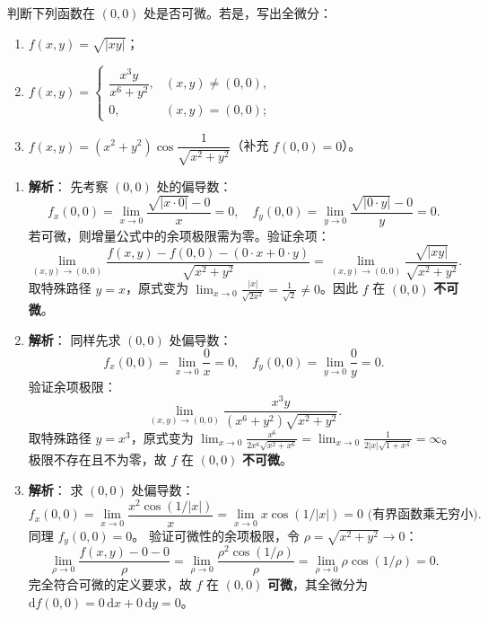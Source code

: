 \documentclass[lang=cn,11pt]{elegantbook}
\begin{document}
\begin{exercise}[可微性判定]
判断下列函数在 $(0,0)$ 处是否可微。若是，写出全微分：
\begin{enumerate}
  \item[(1)] $f(x,y)=\sqrt{|xy|}$；
  \item[(2)] $f(x,y)=\begin{cases} \dfrac{x^3y}{x^6+y^2},&(x,y) \neq (0,0),\\[8pt] 0,&(x,y)=(0,0); \end{cases}$
  \item[(3)] $f(x,y)=(x^2+y^2)\cos\dfrac{1}{\sqrt{x^2+y^2}}$（补充 $f(0,0)=0$）。
\end{enumerate}
\end{exercise}
\begin{solution}
\begin{enumerate}
  \item[(1)] \textbf{解析}：
  先考察 $(0,0)$ 处的偏导数：
  \[
  f_x(0,0) = \lim_{x \to 0} \frac{\sqrt{|x \cdot 0|} - 0}{x} = 0, \quad f_y(0,0) = \lim_{y \to 0} \frac{\sqrt{|0 \cdot y|} - 0}{y} = 0.
  \]
  若可微，则增量公式中的余项极限需为零。验证余项：
  \[
  \lim_{(x,y) \to (0,0)} \frac{f(x,y) - f(0,0) - (0 \cdot x + 0 \cdot y)}{\sqrt{x^2+y^2}} = \lim_{(x,y) \to (0,0)} \frac{\sqrt{|xy|}}{\sqrt{x^2+y^2}}.
  \]
  取特殊路径 $y=x$，原式变为 $\lim_{x \to 0} \frac{|x|}{\sqrt{2x^2}} = \frac{1}{\sqrt{2}} \neq 0$。因此 $f$ 在 $(0,0)$ \textbf{不可微}。
  
  \item[(2)] \textbf{解析}：
  同样先求 $(0,0)$ 处偏导数：
  \[
  f_x(0,0) = \lim_{x \to 0} \frac{0}{x} = 0, \quad f_y(0,0) = \lim_{y \to 0} \frac{0}{y} = 0.
  \]
  验证余项极限：
  \[
  \lim_{(x,y) \to (0,0)} \frac{x^3y}{(x^6+y^2)\sqrt{x^2+y^2}}.
  \]
  取特殊路径 $y=x^3$，原式变为 $\lim_{x \to 0} \frac{x^6}{2x^6\sqrt{x^2+x^6}} = \lim_{x \to 0} \frac{1}{2|x|\sqrt{1+x^4}} = \infty$。极限不存在且不为零，故 $f$ 在 $(0,0)$ \textbf{不可微}。
  
  \item[(3)] \textbf{解析}：
  求 $(0,0)$ 处偏导数：
  \[
  f_x(0,0) = \lim_{x \to 0} \frac{x^2 \cos(1/|x|)}{x} = \lim_{x \to 0} x \cos(1/|x|) = 0 \text{ (有界函数乘无穷小)}.
  \]
  同理 $f_y(0,0) = 0$。
  验证可微性的余项极限，令 $\rho = \sqrt{x^2+y^2} \to 0$：
  \[
  \lim_{\rho \to 0} \frac{f(x,y) - 0 - 0}{\rho} = \lim_{\rho \to 0} \frac{\rho^2 \cos(1/\rho)}{\rho} = \lim_{\rho \to 0} \rho \cos(1/\rho) = 0.
  \]
  完全符合可微的定义要求，故 $f$ 在 $(0,0)$ \textbf{可微}，其全微分为 $\mathrm{d}f(0,0) = 0\,\mathrm{d}x + 0\,\mathrm{d}y = \boxed{0}$。
\end{enumerate}
\end{solution}
\end{document}
